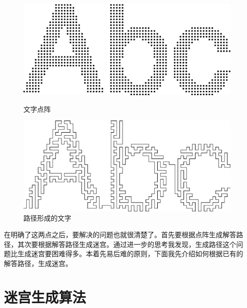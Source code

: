\documentclass[cs4size,a4paper,adobefonts]{ctexart}
\begin{document}
\begin{figure}[htbp]
  \centering
  \begin{minipage}{0.5\textwidth}
    \centering
    \includegraphics[width=0.95\linewidth]{abcGrid}
    \caption{文字点阵}\label{fig:abcGrid}
  \end{minipage}%
  \begin{minipage}{0.5\textwidth}
    \centering
    \includegraphics[width=0.95\linewidth]{abcPath}
    \caption{路径形成的文字}\label{fig:abcPath}
  \end{minipage}
\end{figure}

在明确了这两点之后，要解决的问题也就很清楚了。首先要根据点阵生成解答路
径，其次要根据解答路径生成迷宫。通过进一步的思考我发现，生成路径这个问
题比生成迷宫要困难得多。本着先易后难的原则，下面我先介绍如何根据已有的
解答路径，生成迷宫。

\section{迷宫生成算法}



\end{document}
